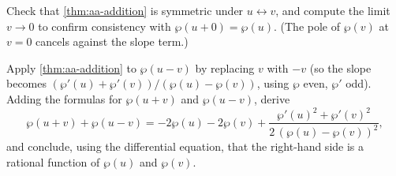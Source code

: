 \begin{exercise}
\label{ex:aa-symmetry}
Check that \cref{thm:aa-addition} is symmetric under \(u \leftrightarrow v\), and
compute the limit \(v \to 0\) to confirm consistency with \(\wp(u+0) = \wp(u)\).
(The pole of \(\wp(v)\) at \(v = 0\) cancels against the slope term.)
\end{exercise}

\begin{exercise}
\label{ex:aa-three-term}
Apply \cref{thm:aa-addition} to \(\wp(u-v)\) by replacing \(v\) with \(-v\) (so the
slope becomes \((\wp'(u) + \wp'(v))/(\wp(u) - \wp(v))\), using \(\wp\) even,
\(\wp'\) odd). Adding the formulas for \(\wp(u+v)\) and \(\wp(u-v)\), derive
\[
  \wp(u+v) + \wp(u-v) = -2\wp(u) - 2\wp(v)
  + \frac{\wp'(u)^2 + \wp'(v)^2}{2\,(\wp(u) - \wp(v))^2},
\]
and conclude, using the differential equation, that the right-hand side is a
rational function of \(\wp(u)\) and \(\wp(v)\).
\end{exercise}
